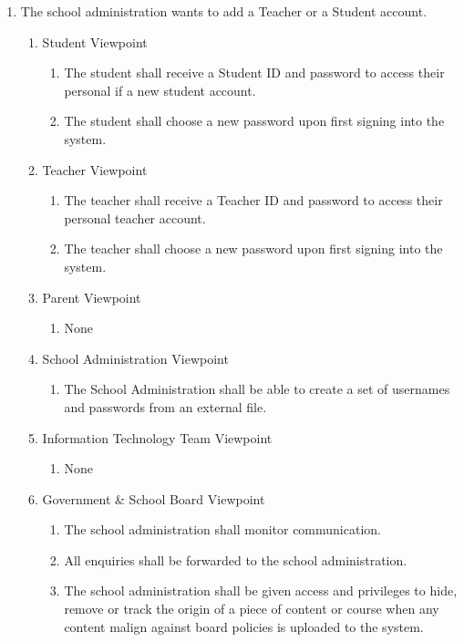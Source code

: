 \documentclass[]{article}
\begin{document}
\begin{enumerate}[{BE}1.]
	\item The school administration wants to add a Teacher or a Student account.
	\begin{enumerate}[{VP1}.1]
		\item Student Viewpoint
			\begin{enumerate}
				\item The student shall receive a Student ID and password to access their
personal if a new student account.
				\item The student shall choose a new password upon first signing into the
system.
			\end{enumerate}
		\item Teacher Viewpoint
			\begin{enumerate}
				\item The teacher shall receive a Teacher ID and password to access their
personal teacher account.
				\item The teacher shall choose a new password upon first signing into the
system.
			\end{enumerate}
		\item Parent Viewpoint
			\begin{enumerate}
				\item None
			\end{enumerate}
		\item School Administration Viewpoint
			\begin{enumerate}
				\item The School Administration shall be able to create a set of usernames
and passwords from an external file.
			\end{enumerate}
		\item Information Technology Team Viewpoint
			\begin{enumerate}
				\item None
			\end{enumerate}
		\item Government \& School Board Viewpoint
			\begin{enumerate}
				\item The school administration shall monitor communication.
				\item All enquiries shall be
forwarded to the school administration.
				\item The school
administration shall be given access and privileges to hide, remove or track the
origin of a piece of content or course when any content malign against board
policies is uploaded to the system.
			\end{enumerate}
	\end{enumerate}


\end{enumerate}
\end{document}
